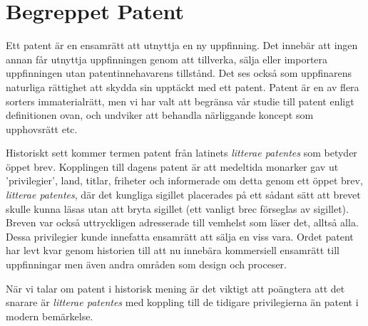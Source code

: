 





\section{Begreppet Patent}

Ett patent är en ensamrätt att utnyttja en ny uppfinning. Det innebär att ingen
annan får utnyttja uppfinningen genom att tillverka, sälja eller importera 
uppfinningen utan patentinnehavarens tillstånd. Det ses också som uppfinarens naturliga rättighet att skydda sin upptäckt med ett patent. Patent är en av flera sorters
immaterialrätt, men vi har valt att begränsa vår studie till patent enligt
definitionen ovan, och undviker att behandla närliggande koncept som upphovsrätt
etc.


Historiskt sett kommer termen patent från latinets \emph{litterae patentes} som
betyder öppet brev. Kopplingen till dagens patent är att medeltida monarker gav
ut 'privilegier', land, titlar, friheter och informerade om detta genom ett
öppet brev, \emph{litterae patentes}, där det kungliga sigillet placerades på
ett sådant sätt att brevet skulle kunna läsas utan att bryta sigillet\cite{blackstone} (ett vanligt brec förseglas av sigillet). Breven var också uttryckligen adresserade till 
vemhelst som läser det, alltså alla. Dessa privilegier kunde innefatta ensamrätt
att sälja en viss vara. Ordet patent har levt kvar genom historien till 
att nu innebära kommersiell ensamrätt till uppfinningar men även andra områden som design och proceser. 

När vi talar om patent i historisk mening är det viktigt att poängtera att det 
snarare är \emph{litterae patentes} med koppling till de tidigare 
privilegierna än patent i modern bemärkelse. 
